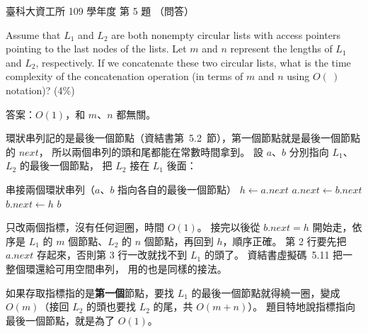 \begin{pastexam}[label={px:ntust-109-ice-05}]{臺科大資工所 109 學年度 第 5 題}
（問答）

Assume that $L_1$ and $L_2$ are both nonempty circular lists with access pointers pointing to the
last nodes of the lists. Let $m$ and $n$ represent the lengths of $L_1$ and $L_2$, respectively. If
we concatenate these two circular lists, what is the time complexity of the concatenation operation
(in terms of $m$ and $n$ using $O(\ )$ notation)? (4\%)
\end{pastexam}

\begin{pastsoln}
答案：$O(1)$，和 $m$、$n$ 都無關。

環狀串列記的是最後一個節點（資結書第~5.2~節），第一個節點就是最後一個節點的 $\mathit{next}$，
所以兩個串列的頭和尾都能在常數時間拿到。 設 $a$、$b$ 分別指向 $L_1$、$L_2$ 的最後一個節點，
把 $L_2$ 接在 $L_1$ 後面：
\begin{pseudo}{串接兩個環狀串列（$a$、$b$ 指向各自的最後一個節點）}
    \State $h \gets a.\mathit{next}$ 
    \State $a.\mathit{next} \gets b.\mathit{next}$ 
    \State $b.\mathit{next} \gets h$ 
    \State \Return $b$ 
\EndFunction
\end{pseudo}
只改兩個指標，沒有任何迴圈，時間 $O(1)$。 接完以後從 $b.\mathit{next} = h$ 開始走，依序是
$L_1$ 的 $m$ 個節點、$L_2$ 的 $n$ 個節點，再回到 $h$，順序正確。 第 2 行要先把 $a.\mathit{next}$
存起來，否則第 3 行一改就找不到 $L_1$ 的頭了。 資結書虛擬碼~5.11 把一整個環還給可用空間串列，
用的也是同樣的接法。

如果存取指標指的是\textbf{第一個}節點，要找 $L_1$ 的最後一個節點就得繞一圈，變成 $O(m)$（接回
$L_2$ 的頭也要找 $L_2$ 的尾，共 $O(m + n)$）。 題目特地說指標指向最後一個節點，就是為了 $O(1)$。
\end{pastsoln}
